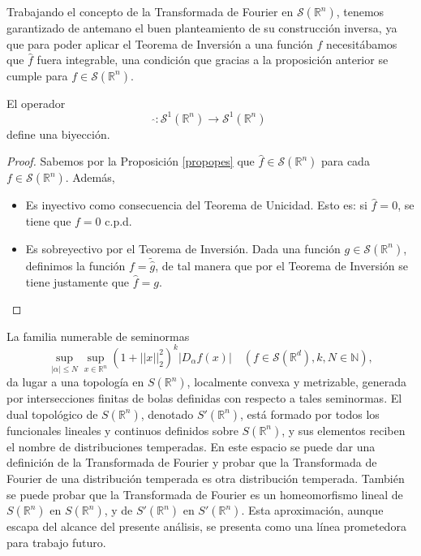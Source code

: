 \begin{observacion}
Trabajando el concepto de la Transformada
de Fourier en $\mathscr{S}(\mathbb{R}^n)$, tenemos garantizado
de antemano el buen planteamiento de su construcción inversa, ya que para poder aplicar el Teorema de Inversión a una función $f$ necesitábamos que $\widehat{f}$ fuera integrable, una condición que gracias a la proposición anterior se cumple para  $f \in \mathscr{S}(\mathbb{R}^n)$.
\end{observacion}

\begin{proposicion}
    El operador
    \begin{equation}
        \widehat{} :  \mathscr{S}^1(\mathbb{R}^n) \rightarrow \mathscr{S}^1(\mathbb{R}^n)
    \end{equation}
define una biyección.
\end{proposicion}
\begin{proof}
\noindent Sabemos por la Proposición \ref{propopes} que  $\widehat{f} \in \mathscr{S}(\mathbb{R}^n)$ para cada $f \in \mathscr{S}(\mathbb{R}^n)$. Además,
\begin{itemize}
    \item Es inyectivo como consecuencia del Teorema de Unicidad. Esto es: si  $\widehat{f}=0$, se tiene que $f=0$ c.p.d.
    \item Es sobreyectivo por el Teorema de Inversión.  Dada una función $g \in \mathscr{S}(\mathbb{R}^n)$, definimos la función $f = \widetilde{\widehat{g}}$, de tal manera que por el Teorema de Inversión se tiene justamente que $\widehat{f}= g$.
\end{itemize}

\end{proof}






\noindent La familia numerable de seminormas 
\[\sup_{|\alpha|\leq N} \sup_{x \in \mathbb{R}^n}(1+||x||_2^2)^k |D_\alpha f(x)| \quad (f\in \mathscr{S}(\mathbb{R}^d),k,N \in \mathbb{N}),\]
da lugar a una topología en $S(\mathbb{R}^n)$, localmente convexa y metrizable, generada por intersecciones finitas de bolas definidas con respecto a tales seminormas. El dual topológico de $S(\mathbb{R}^n)$, denotado $S'(\mathbb{R}^n)$, está formado por todos los funcionales lineales y continuos definidos sobre $S(\mathbb{R}^n)$, y sus elementos reciben el nombre de distribuciones temperadas. En este espacio se puede dar una definición de la Transformada de Fourier y probar que la Transformada
de Fourier de una distribución temperada es otra distribución temperada. También se puede probar que la Transformada de Fourier es un homeomorfismo lineal de
$S(\mathbb{R}^n)$ en $S(\mathbb{R}^n)$, y de $S'(\mathbb{R}^n)$ en $S'(\mathbb{R}^n)$. Esta aproximación, aunque escapa del alcance del presente análisis, se presenta como una línea prometedora para trabajo futuro.



